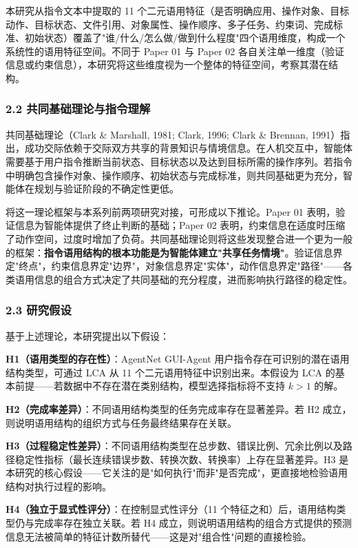 \documentclass[12pt,a4paper,openany,oneside]{ctexrep}
\begin{document}
本研究从指令文本中提取的 11 个二元语用特征（是否明确应用、操作对象、目标动作、目标状态、文件引用、对象属性、操作顺序、多子任务、约束词、完成标准、初始状态）覆盖了"谁/什么/怎么做/做到什么程度"四个语用维度，构成一个系统性的语用特征空间。不同于 Paper 01 与 Paper 02 各自关注单一维度（验证信息或约束信息），本研究将这些维度视为一个整体的特征空间，考察其潜在结构。

\subsubsection{2.2 共同基础理论与指令理解}


共同基础理论（Clark \& Marshall, 1981; Clark, 1996; Clark \& Brennan, 1991）指出，成功交际依赖于交际双方共享的背景知识与情境信息。在人机交互中，智能体需要基于用户指令推断当前状态、目标状态以及达到目标所需的操作序列。若指令中明确包含操作对象、操作顺序、初始状态与完成标准，则共同基础更为充分，智能体在规划与验证阶段的不确定性更低。

将这一理论框架与本系列前两项研究对接，可形成以下推论。Paper 01 表明，验证信息为智能体提供了终止判断的基础；Paper 02 表明，约束信息在适度时压缩了动作空间，过度时增加了负荷。共同基础理论则将这些发现整合进一个更为一般的框架：\textbf{指令语用结构的根本功能是为智能体建立"共享任务情境"}。验证信息界定"终点"，约束信息界定"边界"，对象信息界定"实体"，动作信息界定"路径"——各类语用信息的组合方式决定了共同基础的充分程度，进而影响执行路径的稳定性。

\subsubsection{2.3 研究假设}


基于上述理论，本研究提出以下假设：

\textbf{H1（语用类型的存在性）}：AgentNet GUI-Agent 用户指令存在可识别的潜在语用结构类型，可通过 LCA 从 11 个二元语用特征中识别出来。本假设为 LCA 的基本前提——若数据中不存在潜在类别结构，模型选择指标将不支持 $k>1$ 的解。

\textbf{H2（完成率差异）}：不同语用结构类型的任务完成率存在显著差异。若 H2 成立，则说明语用结构的组织方式与任务最终结果存在关联。

\textbf{H3（过程稳定性差异）}：不同语用结构类型在总步数、错误比例、冗余比例以及路径稳定性指标（最长连续错误步数、转换次数、转换率）上存在显著差异。H3 是本研究的核心假设——它关注的是"如何执行"而非"是否完成"，更直接地检验语用结构对执行过程的影响。

\textbf{H4（独立于显式性评分）}：在控制显式性评分（11 个特征之和）后，语用结构类型仍与完成率存在独立关联。若 H4 成立，则说明语用结构的组合方式提供的预测信息无法被简单的特征计数所替代——这是对"组合性"问题的直接检验。
\end{document}
